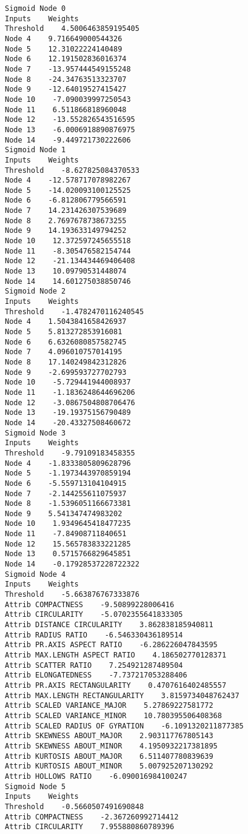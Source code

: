 \documentclass[
	article,			%
	11pt,				%
	oneside,			%
	a4paper,			%
	english,			%
	brazil,				%
	sumario=tradicional
	]{abntex2}
\begin{document}
\begin{lstlisting}
Sigmoid Node 0
Inputs    Weights
Threshold    4.5006463859195405
Node 4    9.716649000544326
Node 5    12.31022224140489
Node 6    12.191502836016374
Node 7    -13.957444549155248
Node 8    -24.34763513323707
Node 9    -12.64019527415427
Node 10    -7.090039997250543
Node 11    6.511866818960048
Node 12    -13.552826543516595
Node 13    -6.0006918890876975
Node 14    -9.449721730222606
Sigmoid Node 1
Inputs    Weights
Threshold    -8.627825084370533
Node 4    -12.578717078982267
Node 5    -14.020093100125525
Node 6    -6.812806779566591
Node 7    14.231426307539689
Node 8    2.7697678738673255
Node 9    14.193633149794252
Node 10    12.372597245655518
Node 11    -8.305476582154744
Node 12    -21.134434469406408
Node 13    10.09790531448074
Node 14    14.601275038850746
Sigmoid Node 2
Inputs    Weights
Threshold    -1.4782470116240545
Node 4    1.5043841658426937
Node 5    5.813272853916081
Node 6    6.6326080857582745
Node 7    4.096010757014195
Node 8    17.140249842312826
Node 9    -2.699593727702793
Node 10    -5.729441944008937
Node 11    -1.1836248644696206
Node 12    -3.0867504808706476
Node 13    -19.19375156790489
Node 14    -20.43327508460672
Sigmoid Node 3
Inputs    Weights
Threshold    -9.79109183458355
Node 4    -1.8333805809628796
Node 5    -1.1973443970859194
Node 6    -5.559713104104915
Node 7    -2.144255611075937
Node 8    -1.5396051166673381
Node 9    5.541347474983202
Node 10    1.9349645418477235
Node 11    -7.84908711840651
Node 12    15.565783833221285
Node 13    0.5715766829645851
Node 14    -0.17928537228722322
Sigmoid Node 4
Inputs    Weights
Threshold    -5.663876767333876
Attrib COMPACTNESS    -9.50899228006416
Attrib CIRCULARITY    -5.0702355641833305
Attrib DISTANCE CIRCULARITY    3.862838185940811
Attrib RADIUS RATIO    -6.546330436189514
Attrib PR.AXIS ASPECT RATIO    -6.286226047843595
Attrib MAX.LENGTH ASPECT RATIO    4.186502770128371
Attrib SCATTER RATIO    7.254921287489504
Attrib ELONGATEDNESS    -7.737217053288406
Attrib PR.AXIS RECTANGULARITY    0.4707616402485557
Attrib MAX.LENGTH RECTANGULARITY    3.8159734048762437
Attrib SCALED VARIANCE_MAJOR    5.27869227581772
Attrib SCALED VARIANCE_MINOR    10.780395506408368
Attrib SCALED RADIUS OF GYRATION    -6.1091320211877385
Attrib SKEWNESS ABOUT_MAJOR    2.903117767805143
Attrib SKEWNESS ABOUT_MINOR    4.1950932217381895
Attrib KURTOSIS ABOUT_MAJOR    6.511407780839639
Attrib KURTOSIS ABOUT_MINOR    5.007925207130292
Attrib HOLLOWS RATIO    -6.090016984100247
Sigmoid Node 5
Inputs    Weights
Threshold    -0.5660507491690848
Attrib COMPACTNESS    -2.367260992714412
Attrib CIRCULARITY    7.955880860789396

\end{lstlisting}
\end{document}
